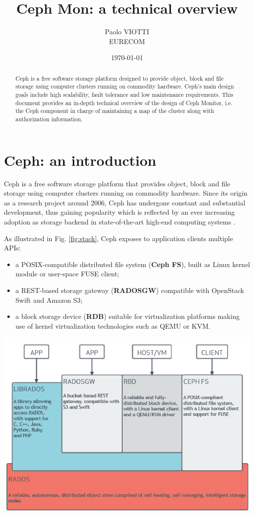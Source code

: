 \documentclass{article}
\title{Ceph Mon: a technical overview}
\author{Paolo VIOTTI\\EURECOM}
\date{\today}
\begin{document}
\maketitle

\begin{abstract}
Ceph is a free software storage platform designed to provide object, block and file storage 
using computer clusters running on commodity hardware. 
Ceph's main design goals include high scalability, fault tolerance and low maintenance requirements.
This document provides an in-depth technical overview of the design of Ceph Monitor, 
i.e. the Ceph component in charge of maintaining a map of the cluster along with authorization information.
\end{abstract}

\section{Ceph: an introduction}
Ceph \cite{ceph} is a free software storage platform that provides object, block and file storage 
using computer clusters running on commodity hardware. 
Since its origin as a research project around 2006, 
Ceph has undergone constant and substantial development,
thus gaining popularity which is reflected by an ever increasing adoption as storage backend in state-of-the-art
high-end computing systems \cite{ceph-openstack}.

As illustrated in Fig. \ref{fig:stack}, Ceph exposes to application clients multiple APIs: 
\begin{itemize}
	\item a POSIX-compatible distributed file system (\textbf{Ceph FS}), built as Linux kernel module or user-space FUSE client;
	\item a REST-based storage gateway (\textbf{RADOSGW}) compatible with OpenStack Swift and Amazon S3;
	\item a block storage device (\textbf{RDB}) suitable for virtualization platforms making use of kernel 
	virtualization technologies such as QEMU or KVM.
\end{itemize}

\begin{center}
	\includegraphics[scale=0.35]{figs/ceph-stack.png}
	\label{fig:stack}
\end{center}
\end{document}
